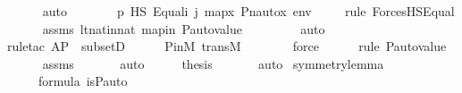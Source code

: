 \begin{isabellebody}
\ \ \ \ \isamarkupfalse%
\ auto\isanewline
\ \ \isamarkupfalse%
\ \isamarkupfalse%
\ {\isachardoublequoteopen}{\isachardot}{\kern0pt}{\isachardot}{\kern0pt}{\isachardot}{\kern0pt}\ {\isasymlongleftrightarrow}\ {\isasympi}{\isacharbackquote}{\kern0pt}p\ {\isasymtturnstile}HS\ Equal{\isacharparenleft}{\kern0pt}i{\isacharcomma}{\kern0pt}\ j{\isacharparenright}{\kern0pt}\ map{\isacharparenleft}{\kern0pt}{\isasymlambda}x{\isachardot}{\kern0pt}\ Pn{\isacharunderscore}{\kern0pt}auto{\isacharparenleft}{\kern0pt}{\isasympi}{\isacharparenright}{\kern0pt}{\isacharbackquote}{\kern0pt}x{\isacharcomma}{\kern0pt}\ env{\isacharparenright}{\kern0pt}{\isachardoublequoteclose}\isanewline
\ \ \ \ \isamarkupfalse%
{\isacharparenleft}{\kern0pt}rule\ ForcesHS{\isacharunderscore}{\kern0pt}Equal{\isacharparenright}{\kern0pt}\isanewline
\ \ \ \ \isamarkupfalse%
\ assms\ lt{\isacharunderscore}{\kern0pt}nat{\isacharunderscore}{\kern0pt}in{\isacharunderscore}{\kern0pt}nat\ mapin\ P{\isacharunderscore}{\kern0pt}auto{\isacharunderscore}{\kern0pt}value\isanewline
\ \ \ \ \ \ \ \isamarkupfalse%
\ auto{\isacharbrackleft}{\kern0pt}{}{\isacharbrackright}{\kern0pt}\isanewline
\ \ \ \ \isamarkupfalse%
{\isacharparenleft}{\kern0pt}rule{\isacharunderscore}{\kern0pt}tac\ A{\isacharequal}{\kern0pt}P\ \ subsetD{\isacharparenright}{\kern0pt}\isanewline
\ \ \ \ \isamarkupfalse%
\ P{\isacharunderscore}{\kern0pt}in{\isacharunderscore}{\kern0pt}M\ transM\ \isanewline
\ \ \ \ \ \isamarkupfalse%
\ force\ \isanewline
\ \ \ \ \isamarkupfalse%
{\isacharparenleft}{\kern0pt}rule\ P{\isacharunderscore}{\kern0pt}auto{\isacharunderscore}{\kern0pt}value{\isacharparenright}{\kern0pt}\isanewline
\ \ \ \ \isamarkupfalse%
\ assms\ \isanewline
\ \ \ \ \isamarkupfalse%
\ auto\isanewline
\ \ \isamarkupfalse%
\ \isamarkupfalse%
\ {\isacharquery}{\kern0pt}thesis\ \isanewline
\ \ \ \ \isamarkupfalse%
\ auto\isanewline
{}\isamarkupfalse%
%
\endisatagproof
{\isafoldproof}%
%
\isadelimproof
\isanewline
%
\endisadelimproof
\isanewline
{}\isamarkupfalse%
\ symmetry{\isacharunderscore}{\kern0pt}lemma{\isacharcolon}{\kern0pt}\isanewline
\ \ \ {\isasymphi}\ {\isasympi}\ \ \isanewline
\ \ \ {\isachardoublequoteopen}{\isasymphi}\ {\isasymin}\ formula{\isachardoublequoteclose}\ {\isachardoublequoteopen}is{\isacharunderscore}{\kern0pt}P{\isacharunderscore}{\kern0pt}auto{\isacharparenleft}{\kern0pt}{\isasympi}{\isacharparenright}{\kern0pt}{\isachardoublequoteclose}\ {\isachardoublequoteopen}{\isasympi}\ {\isasymin}\ {\isasymG}{\isachardoublequoteclose}\ \isanewline

\end{isabellebody}
